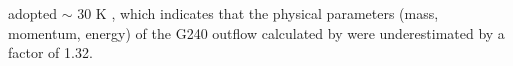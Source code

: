 adopted $\sim$ 30 K \citep{2009ApJ...696...66Q}, which indicates that the physical parameters (mass, momentum, energy) of the G240 outflow calculated by \citet{2009ApJ...696...66Q} were underestimated by a factor of 1.32. 



